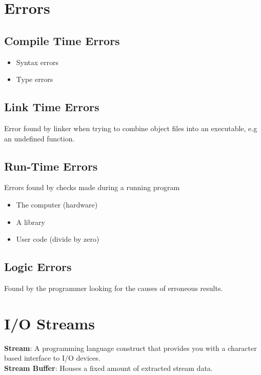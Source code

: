 \documentclass{article}
\begin{document}
	\section{Errors}
	
	\subsection{Compile Time Errors}
	
	\begin{itemize}
		\item Syntax errors
		\item Type errors
	\end{itemize}

	\subsection{Link Time Errors}
	
	Error found by linker when trying to combine object files into an executable, e.g an undefined function.
	
	\subsection{Run-Time Errors}
	
	Errors found by checks made during a running program
	\begin{itemize}
		\item The computer (hardware)
		\item A library
		\item User code (divide by zero)
	\end{itemize}

	\subsection{Logic Errors}
	
	Found by the programmer looking for the causes of erroneous results.
	
	\section{I/O Streams}
	
	\textbf{Stream}: A programming language construct that provides you with a character based interface to I/O devices.\\
	
	\textbf{Stream Buffer}: Houses a fixed amount of extracted stream data.
	
\end{document}
